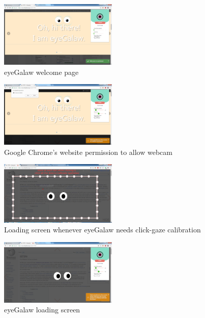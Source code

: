 \documentclass[journal]{./IEEE/IEEEtran}
\begin{document}
\begin{figure}[h!]
  \centering
    \includegraphics[width=0.5\textwidth]{./images/Fig1.png}
  \caption{eyeGalaw welcome page}
  \label{fig:1}
\end{figure}

\begin{figure}[h!]
  \centering
    \includegraphics[width=0.5\textwidth]{./images/Fig2.png}
  \caption{Google Chrome's website permission to allow webcam }
  \label{fig:2}
\end{figure}

\begin{figure}[h!]
  \centering
    \includegraphics[width=0.5\textwidth]{./images/calibrate.png}
  \caption{Loading screen whenever eyeGalaw needs click-gaze calibration}
  \label{fig:3}
\end{figure}

\begin{figure}[h!]
  \centering
    \includegraphics[width=0.5\textwidth]{./images/Loading_screen.png}
  \caption{ eyeGalaw loading screen}
  \label{fig:4}
\end{figure}
\end{document}
